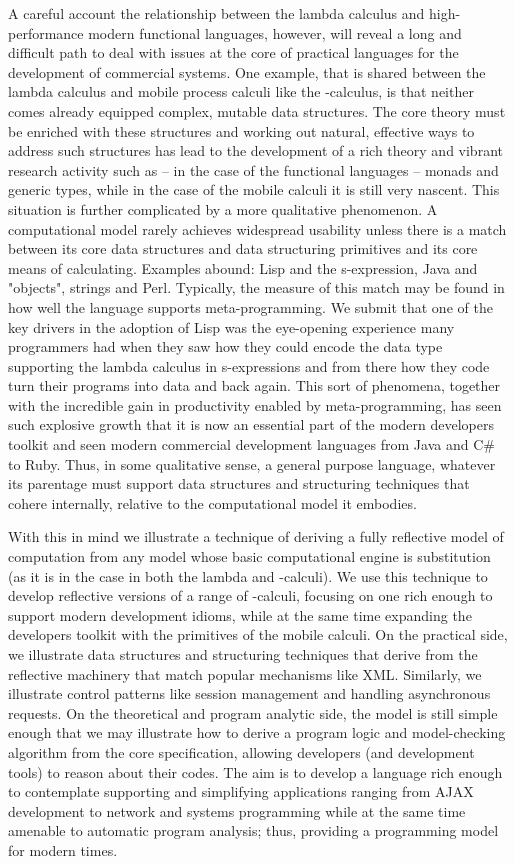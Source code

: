 A careful account the relationship between the lambda calculus and
high-performance modern functional languages, however, will reveal a
long and difficult path to deal with issues at the core of practical
languages for the development of commercial systems. One example, that
is shared between the lambda calculus and mobile process calculi like
the \pi-calculus, is that neither comes already equipped complex,
mutable data structures. The core theory must be enriched with these
structures and working out natural, effective ways to address such
structures has lead to the development of a rich theory and vibrant
research activity such as -- in the case of the functional languages
-- monads and generic types, while in the case of the mobile calculi
it is still very nascent. This situation is further complicated by a
more qualitative phenomenon. A computational model rarely achieves
widespread usability unless there is a match between its core data
structures and data structuring primitives and its core means of
calculating. Examples abound: Lisp and the s-expression, Java and
"objects", strings and Perl. Typically, the measure of this match may
be found in how well the language supports meta-programming. We submit
that one of the key drivers in the adoption of Lisp was the
eye-opening experience many programmers had when they saw how they
could encode the data type supporting the lambda calculus in
s-expressions and from there how they code turn their programs into
data and back again. This sort of phenomena, together with the
incredible gain in productivity enabled by meta-programming, has seen
such explosive growth that it is now an essential part of the modern
developers toolkit and seen modern commercial development languages
from Java and C# to Ruby. Thus, in some qualitative sense, a general
purpose language, whatever its parentage must support data structures
and structuring techniques that cohere internally, relative to the
computational model it embodies.

With this in mind we illustrate a technique of deriving a fully
reflective model of computation from any model whose basic
computational engine is substitution (as it is in the case in both the
lambda and \pi-calculi). We use this technique to develop reflective
versions of a range of \pi-calculi, focusing on one rich enough to
support modern development idioms, while at the same time expanding
the developers toolkit with the primitives of the mobile calculi. On
the practical side, we illustrate data structures and structuring
techniques that derive from the reflective machinery that match
popular mechanisms like XML. Similarly, we illustrate control patterns
like session management and handling asynchronous requests. On the
theoretical and program analytic side, the model is still simple
enough that we may illustrate how to derive a program logic and
model-checking algorithm from the core specification, allowing
developers (and development tools) to reason about their codes. The
aim is to develop a language rich enough to contemplate supporting and
simplifying applications ranging from AJAX development to network and
systems programming while at the same time amenable to automatic
program analysis; thus, providing a programming model for modern
times.
